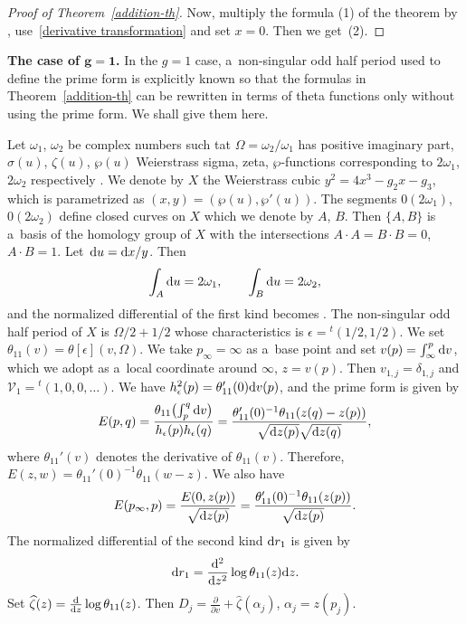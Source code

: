 \documentclass[10pt,a4paper]{amsart}
\numberwithin{equation}{section}
\theoremstyle{definition}
\begin{document}
\begin{proof}[Proof of Theorem~\ref{addition-th}]
Now, multiply the formula (1) of the theorem by
,
use~\eqref{derivative transformation} and set $x=0$. Then we get~(2).
\end{proof}


{\bf The case of $\boldsymbol{ g=1}$.}
In the $g=1$ case, a~non-singular odd half period used to define the prime form is explicitly
known so that the formulas in Theorem~\ref{addition-th} can be rewritten in terms of theta functions only without using the prime form. We shall give them here.

Let $\omega_1$, $\omega_2$ be complex numbers such tat $\Omega=\omega_2/\omega_1$ has
positive imaginary part, $\sigma(u)$, $\zeta(u)$, $\wp(u)$ Weierstrass sigma, zeta, $\wp$-functions corresponding to $2\omega_1$, $2\omega_2$ respectively
\cite{Whittaker-Watson1902}.
We denote by $X$ the Weierstrass cubic
$
y^2=4x^3-g_2x -g_3$,
which is parametrized as $(x,y)=(\wp(u),\wp'(u))$.
 The segments $0(2\omega_1)$, $0(2\omega_2)$
define closed curves on $X$ which we denote by $A$, $B$. Then $\{A,B\}$
is a~basis of the homology group of $X$ with the intersections $A\cdot A=B\cdot B=0$, $A\cdot B=1$. Let~${{\rm d}u={\rm d}x/y}$. Then
\[
\int_A {\rm d}u=2\omega_1,
\qquad
\int_B{\rm d}u=2\omega_2,
\]
and the normalized differential of the first kind becomes
.
The non-singular odd half period of $X$ is $\Omega/2+1/2$ whose characteristics
 is $\epsilon={}^t(1/2,1/2)$. We set
$
\theta_{11}(v)=\theta[\epsilon](v,\Omega)
$.
We take $p_\infty=\infty$ as a~base point and set
$
v(p)=\int_\infty^p {\rm d}v$,
which we adopt as a~local coordinate around $\infty$, $z=v(p)$.
Then $v_{1,j}=\delta_{1,j}$ and ${\mathcal V}_1={}^t(1,0,0,\dots )$.
We have
$
h_\epsilon^2(p)=\theta_{11}'(0){\rm d}v(p)$,
and the prime form is given by
\[
E(p,q)=\frac{\theta_{11}\bigl(\int_p^q {\rm d}v\bigr)}{h_\epsilon(p)h_\epsilon(q)}
=
\frac{\theta_{11}'(0)^{-1}\theta_{11}(z(q)-z(p))}{\sqrt{{\rm d}z(p)}\sqrt{{\rm d}z(q)}},
\]
where $\theta_{11}'(v)$ denotes the derivative of $\theta_{11}(v)$.
Therefore, $
E(z,w)=\theta_{11}'(0)^{-1}\theta_{11}(w-z)$.
We also have
\[
E(p_\infty,p)=\frac{E(0,z(p))}{\sqrt{{\rm d}z(p)}}=
\frac{\theta_{11}'(0)^{-1}\theta_{11}(z(p))}{\sqrt{{\rm d}z(p)}}.
\]
The normalized differential of the second kind ${\rm d}r_1$ is given by
\[
{\rm d}r_1=\frac{{\rm d}^2}{{\rm d}z^2}\log \theta_{11}(z) {\rm d}z.
\]
Set
$
\widehat{\zeta}(z)=\frac{{\rm d}}{{\rm d}z}\log\theta_{11}(z)$.
Then
$
D_j=\frac{\partial}{\partial v}+\widehat{\zeta}(\alpha_j)$,
$
\alpha_j=z(p_j)$.
\end{document}
